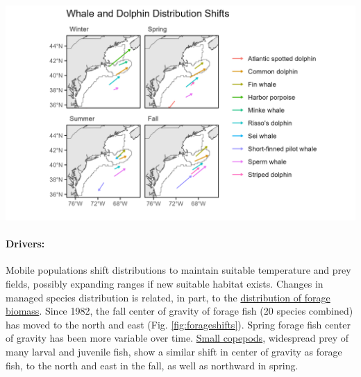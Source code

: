 \documentclass[
  10pt,
]{article}
\let\origfigure\figure
\let\endorigfigure\endfigure
\renewenvironment{figure}[1][2] {
    \expandafter\origfigure\expandafter[H]
} {
    \endorigfigure
}
\begin{document}
\begin{figure}

{\centering \includegraphics[width=6.5in]{images/BothReports/cetacean_dist_BothReports_2025-09-09} 

}

\caption{Direction and magnitude of core habitat shifts, represented by the length of the line of the seasonal weighted centroid for species with more than 70 km difference between 2010 and 2017 (tip of arrow).}\label{fig:protectedspp-dist-shifts}
\end{figure}

\paragraph{Drivers:}\label{drivers}

Mobile populations shift distributions to maintain suitable temperature and prey fields, possibly expanding ranges if new suitable habitat exists. Changes in managed species distribution is related, in part, to the \href{https://noaa-edab.github.io/catalog/forage_index.html}{distribution of forage biomass}. Since 1982, the fall center of gravity of forage fish (20 species combined) has moved to the north and east (Fig. \ref{fig:forageshifts}). Spring forage fish center of gravity has been more variable over time. \href{https://noaa-edab.github.io/catalog/zooplankton_index.html\#key-results-and-visualizations-4}{Small copepods}, widespread prey of many larval and juvenile fish, show a similar shift in center of gravity as forage fish, to the north and east in the fall, as well as northward in spring.
\end{document}
